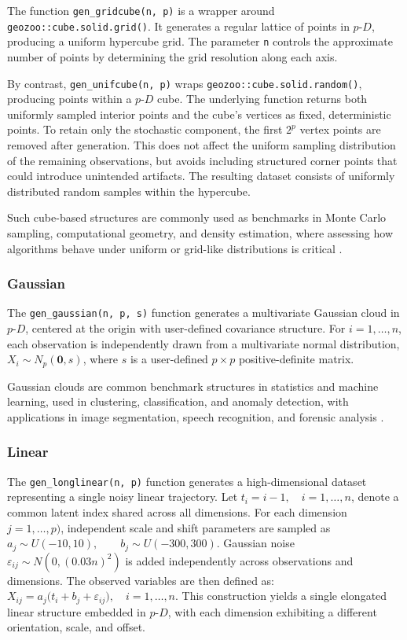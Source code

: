 The function \texttt{gen\_gridcube(n,\ p)} is a wrapper around \texttt{geozoo::cube.solid.grid()}. It generates a regular lattice of points in \(p\text{-}D\), producing a uniform hypercube grid. The parameter \texttt{n} controls the approximate number of points by determining the grid resolution along each axis.

By contrast, \texttt{gen\_unifcube(n,\ p)} wraps \texttt{geozoo::cube.solid.random()}, producing points within a \(p\text{-}D\) cube. The underlying function returns both uniformly sampled interior points and the cube's vertices as fixed, deterministic points. To retain only the stochastic component, the first \(2^{p}\) vertex points are removed after generation. This does not affect the uniform sampling distribution of the remaining observations, but avoids including structured corner points that could introduce unintended artifacts. The resulting dataset consists of uniformly distributed random samples within the hypercube.

Such cube-based structures are commonly used as benchmarks in Monte Carlo sampling, computational geometry, and density estimation, where assessing how algorithms behave under uniform or grid-like distributions is critical \citep{devroye1986, niederreiter1992}.

\subsubsection{Gaussian}\label{gaussian}

The \texttt{gen\_gaussian(n,\ p,\ s)} function generates a multivariate Gaussian cloud in \(p\text{-}D\), centered at the origin with user-defined covariance structure. For
\(i=1,\dots,n\), each observation is independently drawn from a multivariate normal distribution, \(X_i \sim N_p(\boldsymbol{0}, s)\), where \(s\) is a user-defined \(p \times p\) positive-definite matrix.

Gaussian clouds are common benchmark structures in statistics and machine learning, used in clustering, classification, and anomaly detection, with applications in image segmentation, speech recognition, and forensic analysis \citep{geoffrey2000}.

\subsubsection{Linear}\label{linear}

The \texttt{gen\_longlinear(n,\ p)} function generates a high-dimensional dataset representing a single noisy linear trajectory. Let \(t_i = i - 1, \quad i = 1, \dots, n\), denote a common latent index shared across all dimensions. For each dimension \(j = 1, \dots, p)\), independent scale and shift parameters are sampled as \(a_j \sim U(-10, 10), \qquad b_j \sim U(-300, 300)\). Gaussian noise \(\varepsilon_{ij} \sim N(0, (0.03n)^2)\) is added independently across observations and dimensions. The observed variables are then defined as: \(X_{ij} = a_j \bigl(t_i + b_j + \varepsilon_{ij}\bigr), \quad i = 1, \dots, n\). This construction yields a single elongated linear structure embedded in \(p\text{-}D\), with each dimension exhibiting a different orientation, scale, and offset.

